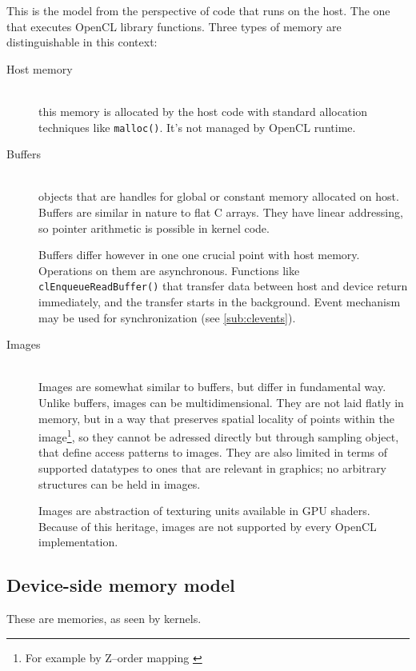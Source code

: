This is the model from the perspective of code that runs on the host. The one
that executes OpenCL library functions. Three types of memory are distinguishable
in this context:

\begin{description}
  \item[Host memory] \hfill \\
    this memory is allocated by the host code with standard allocation techniques
    like \texttt{malloc()}. It's not managed by OpenCL runtime.
  \item[Buffers] \hfill \\
    objects that are handles for global or constant memory allocated on host.
    Buffers are similar in nature to flat C arrays. They have linear addressing,
    so pointer arithmetic is possible in kernel code.

    Buffers differ however in one one crucial point with host memory. Operations
    on them are asynchronous. Functions like \texttt{clEnqueue\-Read\-Buffer()} that
    transfer data between host and device return immediately, and the transfer
    starts in the background. Event mechanism may be used for synchronization
    (see \autoref{sub:clevents}).
  \item[Images] \hfill \\
    Images are somewhat similar to buffers, but differ in fundamental way.
    Unlike buffers, images can be multidimensional. They are not laid flatly in
    memory, but in a way that preserves spatial locality of points within the
    image\footnote{For example by Z--order mapping \parencite[p. 111-113]{gaster2012heterogeneous}},
    so they cannot be adressed directly but through sampling object, that define
    access patterns to images. They are also limited in terms of supported
    datatypes to ones that are relevant in graphics; no arbitrary structures can
    be held in images.

    Images are abstraction of texturing units available in GPU shaders. Because
    of this heritage, images are not supported by every OpenCL implementation.

\end{description}

\subsection{Device-side memory model}

These are memories, as seen by kernels.


